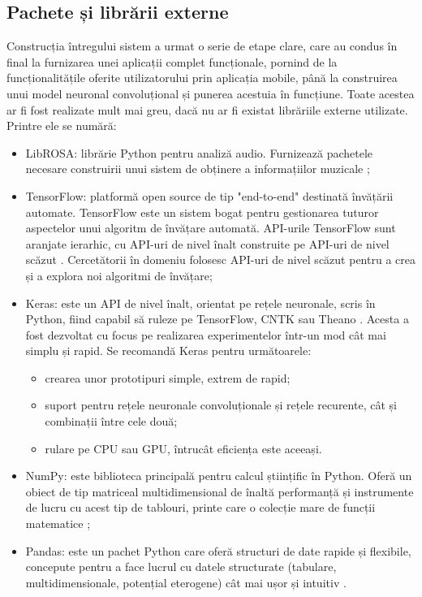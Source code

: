\documentclass[a4paper,12pt]{report}
\begin{document}
\subsection{Pachete și librării externe}
Construcția întregului sistem a urmat o serie de etape clare, care 
au condus în final la furnizarea unei aplicații complet funcționale, 
pornind de la funcționalitățile oferite utilizatorului prin aplicația mobile, 
până la construirea unui model neuronal convoluțional și punerea acestuia 
în funcțiune. Toate acestea ar fi fost realizate mult mai greu, dacă 
nu ar fi existat librăriile externe utilizate. Printre ele se numără:
\begin{itemize}
    \setlength\itemsep{0.2em}
    \item LibROSA: librărie Python pentru analiză audio. 
    Furnizează pachetele necesare construirii unui sistem de obținere a informațiilor muzicale \cite{WEBSITE:librosa};
    \item TensorFlow: platformă open source de tip "end-to-end" destinată
învățării automate. TensorFlow este un sistem bogat pentru gestionarea 
tuturor aspectelor unui algoritm de învățare automată. API-urile TensorFlow 
sunt aranjate ierarhic, cu API-uri de nivel înalt construite pe API-uri 
de nivel scăzut \cite{WEBSITE:ml-crash-course}. Cercetătorii în domeniu folosesc API-uri de nivel 
scăzut pentru a crea și a explora noi algoritmi de învățare;
    \item Keras: este un API de nivel înalt, orientat pe rețele neuronale, 
scris în Python, fiind capabil să ruleze pe TensorFlow, CNTK sau Theano \cite{WEBSITE:ml-crash-course}.
Acesta a fost dezvoltat cu focus pe realizarea experimentelor într-un 
mod cât mai simplu și rapid. Se recomandă Keras pentru următoarele: 
    \begin{itemize}
        \setlength\itemsep{0.2em}
        \item crearea unor prototipuri simple, extrem de rapid;
        \item suport pentru rețele neuronale convoluționale și 
rețele recurente, cât și combinații între cele două;
        \item rulare pe CPU sau GPU, întrucât eficiența este aceeași.
    \end{itemize}
    \item NumPy: este biblioteca principală pentru calcul științific
în Python. Oferă un obiect de tip matriceal multidimensional de 
înaltă performanță și instrumente de lucru cu acest tip de tablouri, 
printe care o colecție mare de funcții matematice \cite{WEBSITE:numpy};
    \item Pandas: este un pachet Python care oferă structuri de date rapide și
flexibile, concepute pentru a face lucrul cu datele structurate 
(tabulare, multidimensionale, potențial eterogene) cât mai ușor și intuitiv \cite{WEBSITE:pandas}.
\end{itemize}
\end{document}

